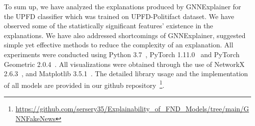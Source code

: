 To sum up, we have analyzed the explanations produced by GNNExplainer for the UPFD classifier which was trained on UPFD-Politifact dataset. We have observed some of the statistically significant features' existence in the explanations. We have also addressed shortcomings of GNNExplainer, suggested simple yet effective methods to reduce the complexity of an explanation. All experiments were conducted using Python 3.7~\parencite{Python_Rossum}, PyTorch 1.11.0~\parencite{PyTorch_Paszke} and PyTorch Geometric 2.0.4~\parencite{PyTorchGeometric_Fey}. All visualizations were obtained through the use of NetworkX 2.6.3~\parencite{NetworkX_Hagberg}, and Matplotlib 3.5.1~\parencite{Matplotlib_Hunter}. The detailed library usage and the implementation of all models are provided in our github repository~\footnote{\url{https://github.com/sersery35/Explainability_of_FND_Models/tree/main/GNNFakeNews}}.